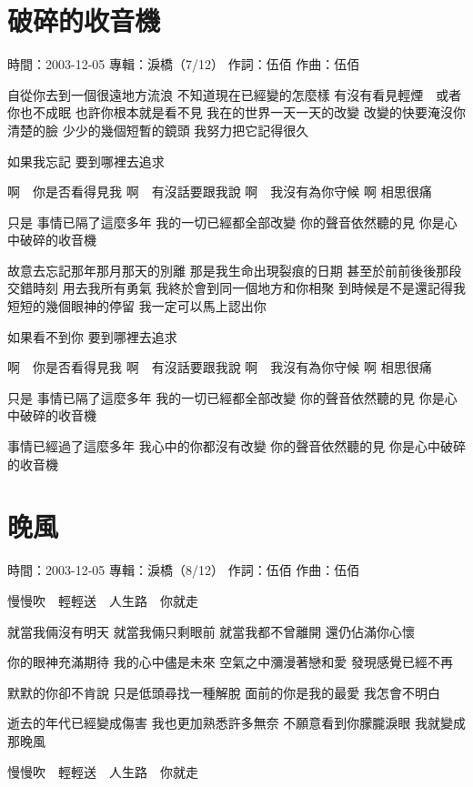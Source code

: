 \documentclass[UTF8,a4paper,oneside,twocolumn,12pt]{ctexbook}
\newcommand{\infopair}[2]{\textbullet #1：#2}
\newcommand{\zc}[1][伍佰]{\infopair{作詞}{#1}}
\newcommand{\zq}[1][伍佰]{\infopair{作曲}{#1}}
\newcommand{\zj}[1]{\infopair{專輯}{#1}}
\newcommand{\sj}[1]{\infopair{時間}{#1}}
\newenvironment{info}{\begin{flushleft}\kaishu
	}
	{\end{flushleft}\normalsize\yahei\par}
\newenvironment{lyric}{
	}
{}
\begin{document}
\section{破碎的收音機}
\begin{info}
	\sj{2003-12-05}
	\zj{淚橋（7/12）}
	\zc
	\zq
\end{info}
\begin{lyric}
	自從你去到一個很遠地方流浪
	不知道現在已經變的怎麼樣
	有沒有看見輕煙　或者你也不成眠
	也許你根本就是看不見
	我在的世界一天一天的改變
	改變的快要淹沒你清楚的臉
	少少的幾個短暫的鏡頭
	我努力把它記得很久

	如果我忘記 要到哪裡去追求

	啊　你是否看得見我
	啊　有沒話要跟我說
	啊　我沒有為你守候
	啊 相思很痛

	只是
	事情已隔了這麼多年
	我的一切已經都全部改變
	你的聲音依然聽的見
	你是心中破碎的收音機

	故意去忘記那年那月那天的別離
	那是我生命出現裂痕的日期
	甚至於前前後後那段交錯時刻
	用去我所有勇氣
	我終於會到同一個地方和你相聚
	到時候是不是還記得我
	短短的幾個眼神的停留
	我一定可以馬上認出你

	如果看不到你 要到哪裡去追求

	啊　你是否看得見我
	啊　有沒話要跟我說
	啊　我沒有為你守候
	啊 相思很痛

	只是
	事情已隔了這麼多年
	我的一切已經都全部改變
	你的聲音依然聽的見
	你是心中破碎的收音機

	事情已經過了這麼多年
	我心中的你都沒有改變
	你的聲音依然聽的見
	你是心中破碎的收音機
\end{lyric}

\section{晚風}
\begin{info}
	\sj{2003-12-05}
	\zj{淚橋（8/12）}
	\zc
	\zq
\end{info}
\begin{lyric}
	慢慢吹　輕輕送　人生路　你就走

	就當我倆沒有明天
	就當我倆只剩眼前
	就當我都不曾離開
	還仍佔滿你心懷

	你的眼神充滿期待
	我的心中儘是未來
	空氣之中瀰漫著戀和愛
	發現感覺已經不再

	默默的你卻不肯說
	只是低頭尋找一種解脫
	面前的你是我的最愛
	我怎會不明白

	逝去的年代已經變成傷害
	我也更加熟悉許多無奈
	不願意看到你朦朧淚眼
	我就變成那晚風

	慢慢吹　輕輕送　人生路　你就走
\end{lyric}
\end{document}

